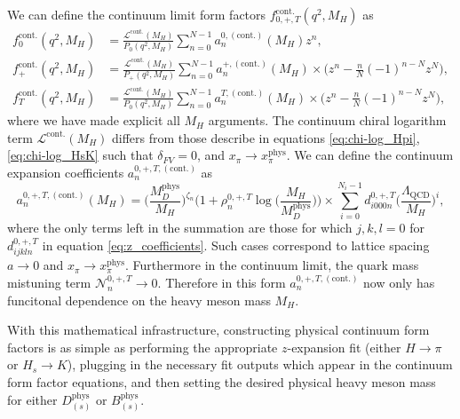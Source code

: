 We can define the continuum limit form factors $f^\mathrm{cont.}_{0,+,T}(q^2,M_H)$ as
\begin{align}\label{eq:continuous_z-expansion}
    f^{\mathrm{cont.}}_0(q^2,M_H)&=\frac{\mathcal{L}^{\mathrm{cont.}}(M_H)}{P_0(q^2,M_H)}\sum_{n=0}^{N-1}a_n^{0,(\mathrm{cont.})}(M_H)z^n,\\
    f^{\mathrm{cont.}}_+(q^2,M_H)&=\frac{\mathcal{L}^{\mathrm{cont.}}(M_H)}{P_+(q^2,M_H)}\sum_{n=0}^{N-1}a_n^{+,(\mathrm{cont.})}(M_H)\times
    \Big(z^n-\frac{n}{N}(-1)^{n-N}z^N\Big),\\
    f^{\mathrm{cont.}}_T(q^2,M_H)&=\frac{\mathcal{L}^{\mathrm{cont.}}(M_H)}{P_0(q^2,M_H)}\sum_{n=0}^{N-1}a_n^{T,(\mathrm{cont.})}(M_H)\times
    \Big(z^n-\frac{n}{N}(-1)^{n-N}z^N\Big),
  \end{align}
where we have made explicit all $M_H$ arguments.  The continuum chiral logarithm term $\mathcal{L}^{\mathrm{cont.}}(M_H)$ differs from those describe in equations \ref{eq:chi-log_Hpi}, \ref{eq:chi-log_HsK} such that $\delta_{FV}=0$, and $x_\pi \rightarrow x_\pi^\mathrm{phys}$.  We can define the continuum expansion coefficients $a_n^{0,+,T,(\mathrm{cont.})}$ as
\begin{equation}\label{eq:a_continuous}
     a_n^{0,+,T,(\mathrm{cont.})}(M_H)=
    \Big(\frac{M^{\mathrm{phys}}_D}{M_H}\Big)^{\zeta_n}\Big(1+\rho_n^{0,+,T}\log\Big(\frac{M_{H}}{M^{\mathrm{phys}}_{D}}\Big)\Big)\times
    \sum^{N_{i}-1}_{i=0}d_{i000n}^{0,+,T}\Big(\frac{\Lambda_{\mathrm{QCD}}}{M_{H}}\Big)^i,
\end{equation}
where the only terms left in the summation are those for which $j,k,l=0$ for $d^{0,+,T}_{ijkln}$ in equation \ref{eq:z_coefficients}.  Such cases correspond to lattice spacing $a\rightarrow0$ and $x_\pi \rightarrow x_\pi^\mathrm{phys}$.  Furthermore in the continuum limit, the quark mass mistuning term $\mathcal{N}_n^{0,+,T} \rightarrow 0$. Therefore in this form $ a_n^{0,+,T,(\mathrm{cont.})}$ now only has funcitonal dependence on the heavy meson mass $M_H$.

With this mathematical infrastructure, constructing physical continuum form factors is as simple as performing the appropriate $z$-expansion fit (either $H\rightarrow\pi$ or $H_s \rightarrow K$), plugging in the necessary fit outputs which appear in the continuum form factor equations, and then setting the desired physical heavy meson mass for either $D^\mathrm{phys}_{(s)}$ or $B^\mathrm{phys}_{(s)}$.

